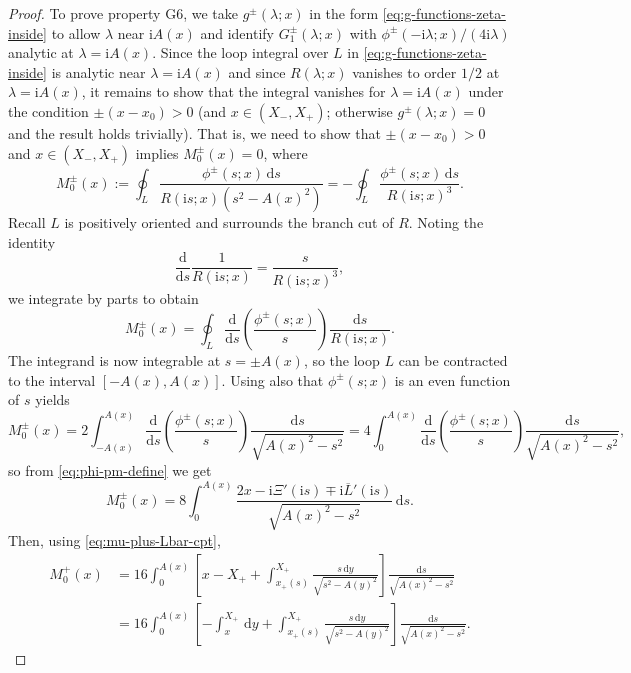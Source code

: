 \documentclass[12pt]{amsart}
\numberwithin{equation}{section}
\newcommand{\dd}{\mathrm{d}}
\newcommand{\ii}{\mathrm{i}}
\newcommand{\SP}{\lambda}
\newcommand{\tailint}{\Xi}
\begin{document}
\begin{proof}
To prove property G6, we take $g^\pm(\SP;x)$ in the form \eqref{eq:g-functions-zeta-inside} to allow $\SP$ near $\ii A(x)$ and identify $G_1^\pm(\SP;x)$ with $\phi^\pm(-\ii\SP;x)/(4\ii\SP)$ analytic at $\SP=\ii A(x)$.  Since the loop integral over $L$ in \eqref{eq:g-functions-zeta-inside} is analytic near $\SP=\ii A(x)$ and since $R(\SP;x)$ vanishes to order $1/2$ at $\SP=\ii A(x)$, it remains to show that the integral vanishes for $\SP=\ii A(x)$ under the condition $\pm (x-x_0)>0$ (and $x\in (X_-,X_+)$; otherwise $g^\pm(\SP;x)=0$ and the result holds trivially).  That is, we need to show that $\pm(x-x_0)>0$ and $x\in (X_-,X_+)$ implies $M_0^\pm(x)=0$, where
\begin{equation}
M_0^\pm(x):=\oint_L\frac{\phi^\pm(s;x)\,\dd s}{R(\ii s;x)(s^2-A(x)^2)}=-\oint_L\frac{\phi^\pm(s;x)\,\dd s}{R(\ii s;x)^3}.
\end{equation}
Recall $L$ is positively oriented and surrounds the branch cut of $R$.
Noting the identity 
\begin{equation}
\frac{\dd}{\dd s}\frac{1}{R(\ii s;x)}=\frac{s}{R(\ii s;x)^3},
\end{equation}
we integrate by parts to obtain
\begin{equation}
M_0^\pm(x)=\oint_L\frac{\dd}{\dd s}\left(\frac{\phi^\pm(s;x)}{s}\right)\frac{\dd s}{R(\ii s;x)}.
\end{equation}
The integrand is now integrable at $s=\pm A(x)$, so the loop $L$ can be contracted to the interval $[-A(x),A(x)]$.  Using also that $\phi^\pm(s;x)$ is an even function of $s$ yields
\begin{equation}
M_0^\pm(x)=2\int_{-A(x)}^{A(x)}\frac{\dd}{\dd s}\left(\frac{\phi^\pm(s;x)}{s}\right)\frac{\dd s}{\sqrt{A(x)^2-s^2}} = 4\int_0^{A(x)}\frac{\dd}{\dd s}\left(\frac{\phi^\pm(s;x)}{s}\right)\frac{\dd s}{\sqrt{A(x)^2-s^2}},
\end{equation}
so from \eqref{eq:phi-pm-define} we get
\begin{equation}
M_0^\pm(x)=8\int_0^{A(x)}\frac{2x-\ii\tailint'(\ii s)\mp \ii\overline{L}'(\ii s)}{\sqrt{A(x)^2-s^2}}\,\dd s.
\end{equation}
Then, using \eqref{eq:mu-plus-Lbar-cpt},
\begin{equation}
\begin{split}
M_0^+(x)&=16\int_0^{A(x)}\left[x-X_++\int_{x_+(s)}^{X_+}\frac{s\,\dd y}{\sqrt{s^2-A(y)^2}}\right]\frac{\dd s}{\sqrt{A(x)^2-s^2}}\\
&=16\int_0^{A(x)}\left[-\int_x^{X_+}\,\dd y +\int_{x_+(s)}^{X_+}\frac{s\,\dd y}{\sqrt{s^2-A(y)^2}}\right]\frac{\dd s}{\sqrt{A(x)^2-s^2}}.

\end{split}
\end{equation}
\end{proof}
\end{document}
